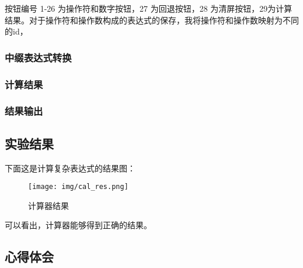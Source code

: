 \documentclass[proposal-report]{bitart}
\begin{document}
按钮编号 1-26 为操作符和数字按钮，27 为回退按钮，28 为清屏按钮，29为计算结果。对于操作符和操作数构成的表达式的保存，我将操作符和操作数映射为不同的id，


\subsubsection{中缀表达式转换}

\subsubsection{计算结果}

\subsubsection{结果输出}

\subsection{实验结果}

下面这是计算复杂表达式的结果图：

\begin{figure}[H]
  \centering
  \texttt{[image: img/cal\_res.png]}
  \caption{计算器结果}
\end{figure}

可以看出，计算器能够得到正确的结果。

\subsection{心得体会}
\end{document}
